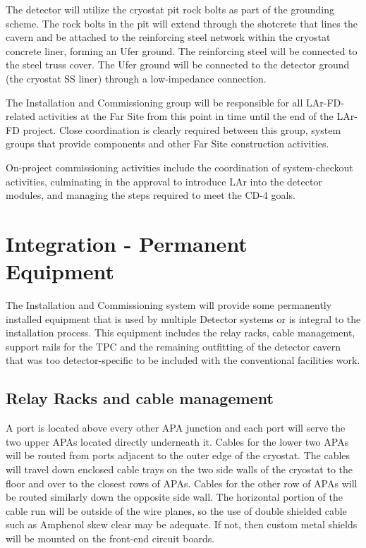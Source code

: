 The detector will utilize the cryostat pit rock bolts as part of the grounding scheme. The rock bolts in the pit will extend through the shotcrete that lines the cavern and be attached to the reinforcing steel network within the cryostat concrete liner, forming an Ufer ground. The reinforcing steel will be connected to the steel truss cover. The Ufer ground will be connected to the detector ground (the cryostat SS liner) through a low-impedance connection.

The Installation and Commissioning group will be responsible for all LAr-FD-related activities at the Far Site from this point in time until the end of the LAr-FD project. Close coordination is clearly required between this group, system groups that provide components and other Far Site construction activities. 

On-project commissioning activities include the coordination of system-checkout activities, culminating in the approval to introduce LAr into the detector modules, and managing the steps required to meet the CD-4 goals. 

\section{Integration - Permanent Equipment}
\label{fd:install:integ}

The Installation and Commissioning system will provide some permanently installed equipment that is 
used by multiple Detector systems or is integral to the installation process.  This equipment includes the 
relay racks, cable management, support rails for the TPC and the remaining outfitting of the detector 
cavern that was too detector-specific to be included with the conventional facilities work.

\subsection{Relay Racks and cable management}
\label{fd:install:integ:racks}

A port is located above every other APA junction and each port will serve the two upper APAs located directly underneath it. Cables for the lower two APAs will be routed from ports adjacent to the outer edge 
of the cryostat.  The cables will travel down enclosed cable trays on the two side walls of the cryostat to the floor and over to the closest rows of APAs.  Cables for the other row of APAs will be routed similarly 
down the opposite side wall.  The horizontal portion of the cable run will be outside of the wire planes, so the use of double shielded cable such as Amphenol skew clear may be adequate. If not, then custom metal shields will be mounted on the front-end circuit boards. 

